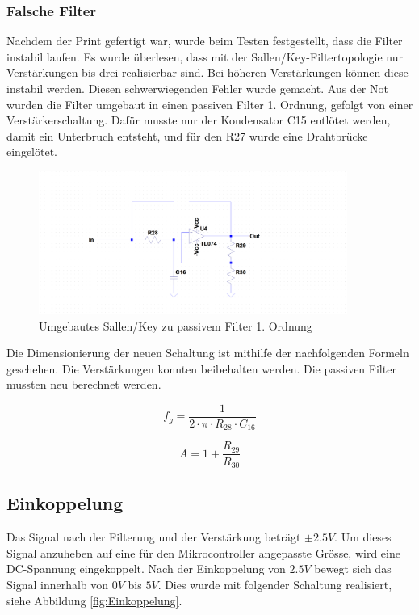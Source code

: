 \subsubsection*{Falsche Filter}
Nachdem der Print gefertigt war, wurde beim Testen festgestellt, dass die Filter instabil laufen. Es wurde überlesen, dass mit der Sallen/Key-Filtertopologie nur Verstärkungen bis drei realisierbar sind. Bei höheren Verstärkungen können diese instabil werden. Diesen schwerwiegenden Fehler wurde gemacht. Aus der Not wurden die Filter umgebaut in einen passiven Filter 1. Ordnung, gefolgt von einer Verstärkerschaltung. Dafür musste nur der Kondensator C15 entlötet werden, damit ein Unterbruch entsteht, und für den R27 wurde eine Drahtbrücke eingelötet.

\begin{figure}[H]
\begin{center}
\includegraphics[width=0.9\textwidth]{images/Analoge_Schaltung_Sallentopassive.png}
\caption{Umgebautes Sallen/Key zu passivem Filter 1. Ordnung}
\end{center}
\end{figure}

Die Dimensionierung der neuen Schaltung ist mithilfe der nachfolgenden Formeln geschehen. Die Verstärkungen konnten beibehalten werden. Die passiven Filter mussten neu berechnet werden.\cite{wiki}

\begin{equation}
f_g=\frac{1}{2 \cdot \pi \cdot R_{28} \cdot C_{16}}
\label{eq:Grenzfrequenz}
\end{equation}

\begin{equation}
A=1+\frac{R_{29}}{R_{30}}
\label{eq:Verstärkung}
\end{equation}

\subsection{Einkoppelung}
Das Signal nach der Filterung und der Verstärkung beträgt $\pm 2.5V$. Um dieses Signal anzuheben auf eine für den Mikrocontroller angepasste Grösse, wird eine DC-Spannung eingekoppelt. Nach der Einkoppelung von $2.5V$ bewegt sich das Signal innerhalb von $0V$ bis $5V$. Dies wurde mit folgender Schaltung realisiert, siehe Abbildung \ref{fig:Einkoppelung}.



